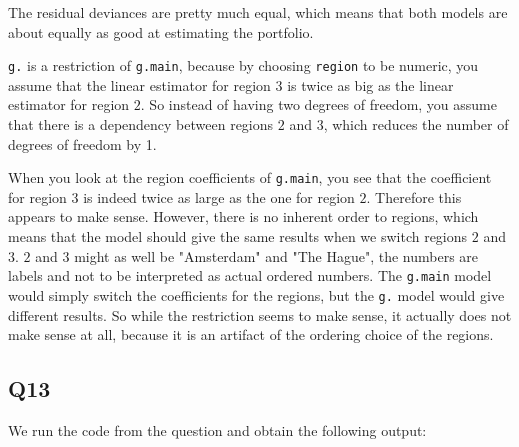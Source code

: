 \documentclass[11pt]{article}
\begin{document}
The residual deviances are pretty much equal, which means that both models are about equally as good at estimating the portfolio.

\verb|g.| is a restriction of \verb|g.main|, because by choosing \verb|region| to be numeric, you assume that the linear estimator for region $3$ is twice as big as the linear estimator for region $2$. So instead of having two degrees of freedom, you assume that there is a dependency between regions $2$ and $3$, which reduces the number of degrees of freedom by 1.

When you look at the region coefficients of \verb|g.main|, you see that the coefficient for region $3$ is indeed twice as large as the one for region $2$. Therefore this appears to make sense. However, there is no inherent order to regions, which means that the model should give the same results when we switch regions $2$ and $3$. $2$ and $3$ might as well be "Amsterdam" and "The Hague", the numbers are labels and not to be interpreted as actual ordered numbers. The \verb|g.main| model would simply switch the coefficients for the regions, but the \verb|g.| model would give different results. So while the restriction seems to make sense, it actually does not make sense at all, because it is an artifact of the ordering choice of the regions.

\subsection*{Q13}
We run the code from the question and obtain the following output:
\end{document}
